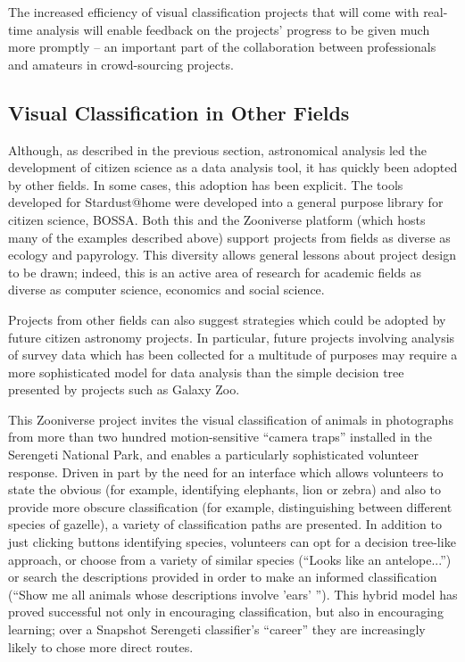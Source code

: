\documentclass{ar2e}
\begin{document}
The increased  efficiency of visual classification projects that will come with
real-time analysis will enable feedback on the projects' progress to be given
much more promptly -- an important part of the collaboration between
professionals and amateurs in crowd-sourcing projects.



\subsection{Visual Classification in Other Fields}
\label{sec:class:non-astro}

Although, as described in the previous section, astronomical analysis led the
development of citizen science as a data analysis tool, it has quickly been
adopted by other fields. In some cases, this adoption has been explicit. The
tools developed for Stardust@home were developed into a general purpose
library for citizen science, BOSSA.
Both this and the Zooniverse platform (which hosts many of the examples
described above) support projects from fields as diverse as ecology and
papyrology. This diversity allows general lessons about project
design to be drawn; indeed, this is an active area of research for academic
fields as diverse as computer science, economics and social science. 


Projects from other fields can also suggest strategies which could be adopted
by future citizen astronomy projects. In particular, future projects involving
analysis of survey data which has been collected for a multitude of purposes
may require a more sophisticated model for data analysis than the simple
decision tree presented by projects such as Galaxy Zoo. 


This Zooniverse project invites the visual classification of animals in
photographs from more than two hundred motion-sensitive ``camera traps''
installed in the Serengeti National Park, and enables a particularly
sophisticated volunteer response. Driven in part by the need for an interface
which allows volunteers to state the obvious (for example, identifying
elephants, lion or zebra) and also to provide more obscure classification (for
example, distinguishing between different species of gazelle),  a variety of
classification paths are presented. In addition to just clicking buttons
identifying species, volunteers can opt for a decision tree-like approach, or
choose from a variety of similar species (``Looks like an antelope...'') or
search the descriptions provided in order to make an informed  classification
(``Show me all animals whose descriptions involve 'ears' ''). This hybrid model
has proved successful not only in encouraging classification, but also in
encouraging learning; over a Snapshot Serengeti classifier's ``career'' they are
increasingly likely to chose more direct routes.
\end{document}
